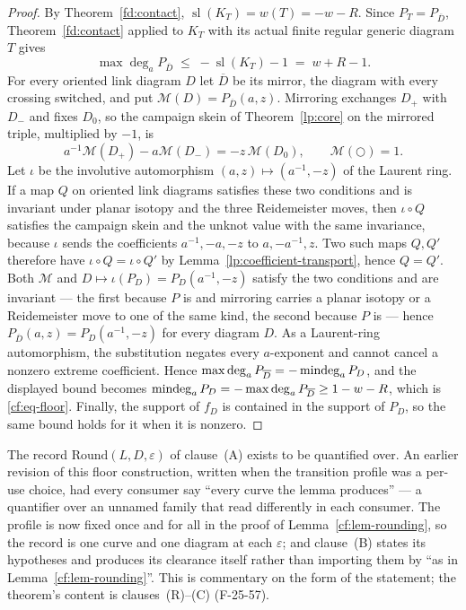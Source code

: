 \begin{proof}
By Theorem~\ref{fd:contact}, $\operatorname{sl}(K_T)=w(T)=-w-R$. Since
$P_T=P_{\overline D}$, Theorem~\ref{fd:contact} applied to $K_T$ with its
actual finite regular generic diagram $T$ gives
\[
\max\deg_a P_{\overline D}\;\leq\;-\operatorname{sl}(K_T)-1\;=\;w+R-1 .
\]
For every oriented link diagram $D$ let $\overline D$ be its mirror, the
diagram with every crossing switched, and put
$\mathcal M(D)=P_{\overline D}(a,z)$. Mirroring exchanges $D_+$ with $D_-$
and fixes $D_0$, so the campaign skein of Theorem~\ref{lp:core} on the
mirrored triple, multiplied by $-1$, is
\[
 a^{-1}\mathcal M(D_+)-a\mathcal M(D_-)=-z\,\mathcal M(D_0),
 \qquad \mathcal M(\bigcirc)=1.
\]
Let $\iota$ be the involutive automorphism $(a,z)\mapsto(a^{-1},-z)$ of
the Laurent ring. If a map $Q$ on oriented link diagrams satisfies these
two conditions and is invariant under planar isotopy and the three
Reidemeister moves, then $\iota\circ Q$ satisfies the campaign skein and
the unknot value with the same invariance, because $\iota$ sends the
coefficients $a^{-1},-a,-z$ to $a,-a^{-1},z$. Two such maps $Q,Q'$
therefore have $\iota\circ Q=\iota\circ Q'$ by
Lemma~\ref{lp:coefficient-transport}, hence $Q=Q'$. Both $\mathcal M$
and $D\mapsto\iota(P_D)=P_D(a^{-1},-z)$ satisfy the two conditions and are
invariant --- the first because $P$ is and mirroring carries a planar
isotopy or a Reidemeister move to one of the same kind, the second because
$P$ is --- hence $P_{\overline D}(a,z)=P_D(a^{-1},-z)$ for every diagram
$D$. As a Laurent-ring automorphism, the
substitution negates every $a$-exponent and cannot cancel a nonzero extreme
coefficient. Hence
$\max\deg_a P_{\overline D}=-\operatorname{mindeg}_a P_D$, and the displayed bound becomes
$\operatorname{mindeg}_a P_D=-\max\deg_a P_{\overline D}\geq1-w-R$, which is
\eqref{cf:eq-floor}. Finally, the support of $f_D$ is contained in the support of
$P_D$, so the same bound holds for it when it is nonzero.

\end{proof}

\begin{remark}\label{rem:rounding-record}
The record $\mathrm{Round}(L,D,\varepsilon)$ of clause~(A) exists to be
quantified over. An earlier revision of this floor construction, written
when the transition profile was a per-use choice, had every consumer say
``every curve the lemma produces'' --- a quantifier over an unnamed family
that read differently in each consumer. The profile is now fixed once and
for all in the proof of Lemma~\ref{cf:lem-rounding}, so the record is one
curve and one diagram at each $\varepsilon$; and clause~(B) states its
hypotheses and produces its clearance itself rather than importing them by
``as in Lemma~\ref{cf:lem-rounding}''. This is commentary on the form of
the statement; the theorem's content is clauses~(R)--(C) (F-25-57).
\end{remark}


